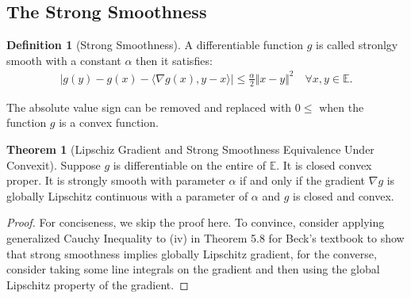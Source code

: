 \documentclass[]{article}
\theoremstyle{definition}
\newtheorem{theorem}{Theorem}       %
\newtheorem{definition}{Definition}
\begin{document}
    \subsection{The Strong Smoothness}
        \begin{definition}[Strong Smoothness]\label{def:strong_smoothness}
            A differentiable function $g$ is called stronlgy smooth with a constant $\alpha$ then it satisfies: 
            \begin{align}
                |g(y) - g(x) - 
                \langle \nabla g(x), y - x
                \rangle| \le \frac{\alpha}{2}\Vert x - y\Vert^2
                \quad \forall x, y\in \mathbb E. 
            \end{align}    
        \end{definition}
        The absolute value sign can be removed and replaced with $0\le$ when the function $g$ is a convex function.
        \begin{theorem}[Lipschiz Gradient and Strong Smoothness Equivalence Under Convexit]\label{thm:cvx_lipz_grad}
            Suppose $g$ is differentiable on the entire of $\mathbb E$. It is closed convex proper. It is strongly smooth with parameter $\alpha$ if and only if the gradient $\nabla g$ is globally Lipschitz continuous with a parameter of $\alpha$ and $g$ is closed and convex. 
        \end{theorem}
        \begin{proof}
            For conciseness, we skip the proof here. To convince, consider applying generalized Cauchy Inequality to (iv) in Theorem 5.8 for Beck's textbook \cite{paper:FISTA} to show that strong smoothness implies globally Lipschitz gradient, for the converse, consider taking some line integrals on the gradient and then using the global Lipschitz property of the gradient. 
        \end{proof}
        
\end{document}
